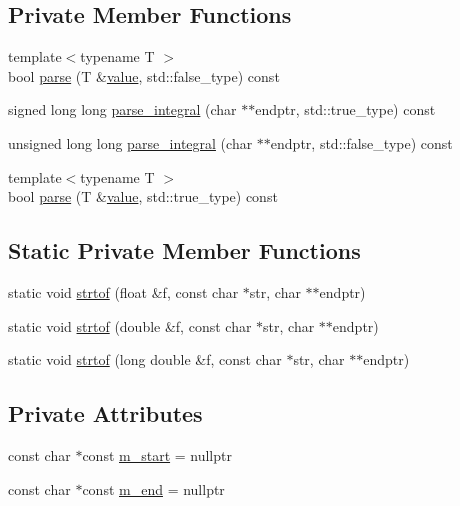 \subsection*{Private Member Functions}
\begin{DoxyCompactItemize}
\item 
{\footnotesize template$<$typename T $>$ }\\bool \hyperlink{structnlohmann_1_1basic__json_1_1lexer_1_1strtonum_a1b8ad9fbc203c178fa8a7fcaebf396b7}{parse} (T \&\hyperlink{classnlohmann_1_1basic__json_af9c51328fbe1da75eca750be3009917a}{value}, std\+::false\+\_\+type) const
\item 
signed long long \hyperlink{structnlohmann_1_1basic__json_1_1lexer_1_1strtonum_a3c5beafdf848370feedbb7792b6cb397}{parse\+\_\+integral} (char $\ast$$\ast$endptr, std\+::true\+\_\+type) const
\item 
unsigned long long \hyperlink{structnlohmann_1_1basic__json_1_1lexer_1_1strtonum_a8c3aa1c91358f647f90157de9e025f09}{parse\+\_\+integral} (char $\ast$$\ast$endptr, std\+::false\+\_\+type) const
\item 
{\footnotesize template$<$typename T $>$ }\\bool \hyperlink{structnlohmann_1_1basic__json_1_1lexer_1_1strtonum_a3f225f7e285eda15af4fd1a6754b6fe7}{parse} (T \&\hyperlink{classnlohmann_1_1basic__json_af9c51328fbe1da75eca750be3009917a}{value}, std\+::true\+\_\+type) const
\end{DoxyCompactItemize}
\subsection*{Static Private Member Functions}
\begin{DoxyCompactItemize}
\item 
static void \hyperlink{structnlohmann_1_1basic__json_1_1lexer_1_1strtonum_ad6996c1546ef27c8a241d2326dd46455}{strtof} (float \&f, const char $\ast$str, char $\ast$$\ast$endptr)
\item 
static void \hyperlink{structnlohmann_1_1basic__json_1_1lexer_1_1strtonum_ad0978eee3e7d2e0478a5f15e584fdb2f}{strtof} (double \&f, const char $\ast$str, char $\ast$$\ast$endptr)
\item 
static void \hyperlink{structnlohmann_1_1basic__json_1_1lexer_1_1strtonum_a454daac40de04902038556764a69d6f2}{strtof} (long double \&f, const char $\ast$str, char $\ast$$\ast$endptr)
\end{DoxyCompactItemize}
\subsection*{Private Attributes}
\begin{DoxyCompactItemize}
\item 
const char $\ast$const \hyperlink{structnlohmann_1_1basic__json_1_1lexer_1_1strtonum_a325d967d65cab640cabbea12c8531c28}{m\+\_\+start} = nullptr
\item 
const char $\ast$const \hyperlink{structnlohmann_1_1basic__json_1_1lexer_1_1strtonum_a4878c8bc7756e8ff1cde8b7aa50c85c8}{m\+\_\+end} = nullptr
\end{DoxyCompactItemize}


